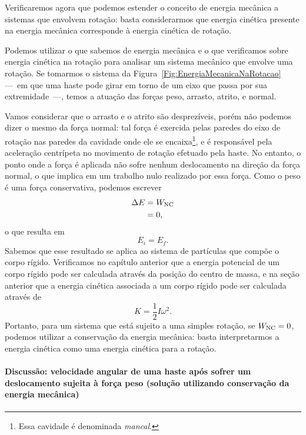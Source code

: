 Verificaremos agora que podemos estender o conceito de energia mecânica a sistemas que envolvem rotação: basta considerarmos que energia cinética presente na energia mecânica corresponde à energia cinética de rotação.

Podemos utilizar o que sabemos de energia mecânica e o que verificamos sobre energia cinética na rotação para analisar um sistema mecânico que envolve uma rotação. Se tomarmos o sistema da Figura~\ref{Fig:EnergiaMecanicaNaRotacao} ---~em que uma haste pode girar em torno de um eixo que passa por sua extremidade~---, temos a atuação das forças peso, arrasto, atrito, e normal.

Vamos considerar que o arrasto e o atrito são desprezíveis, porém não podemos dizer o mesmo da força normal: tal força é exercida pelas paredes do eixo de rotação nas paredes da cavidade onde ele se encaixa\footnote{Essa cavidade é denominada \emph{mancal}.}, e é responsável pela aceleração centrípeta no movimento de rotação efetuado pela haste. No entanto, o ponto onde a força é aplicada não sofre nenhum deslocamento na direção da força normal, o que implica em um trabalho nulo realizado por essa força. Como o peso é uma força conservativa, podemos escrever
\begin{align}
    \Delta E &= W_{\rm{NC}} \\
    &= 0,
\end{align}
%
o que resulta em
\begin{equation}
    E_i = E_f.
\end{equation}
%
Sabemos que esse resultado se aplica ao sistema de partículas que compõe o corpo rígido. Verificamos no capítulo anterior que a energia potencial de um corpo rígido pode ser calculada através da posição do centro de massa, e na seção anterior que a energia cinética associada a um corpo rígido pode ser calculada através de 
\begin{equation}
    K = \frac{1}{2} I\omega^2.
\end{equation}
%
Portanto, para um sistema que está sujeito a uma simples rotação, se $W_{\rm{NC}} = 0$, podemos utilizar a conservação da energia mecânica: basta interpretarmos a energia cinética como uma energia cinética para a rotação.

\paragraph{Discussão: velocidade angular de uma haste após sofrer um deslocamento sujeita à força peso (solução utilizando conservação da energia mecânica)}

